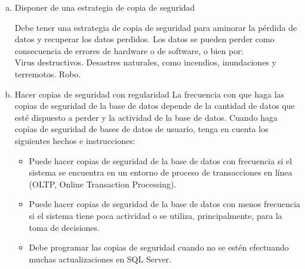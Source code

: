 \documentclass[a4paper,twocolumn,10pt]{article}
\begin{document}
   \begin{enumerate}[a)]
        \item Disponer de una estrategia de copia de seguridad

\normalsize Debe tener una estrategia de copia de seguridad para aminorar la p\'erdida de datos y recuperar los datos perdidos. Los datos se pueden perder como consecuencia de errores de hardware o de software, o bien por:\\

\normalsize Virus destructivos.
\normalsize Desastres naturales, como incendios, inundaciones y terremotos.
\normalsize Robo.\\

      \item  Hacer copias de seguridad con regularidad
La frecuencia con que haga las copias de seguridad de la base de datos depende de la cantidad de datos que est\'e dispuesto a perder y la actividad de la base de datos. Cuando haga copias de seguridad de bases de datos de usuario, tenga en cuenta los siguientes hechos e instrucciones:
  \begin{itemize}
    \item Puede hacer copias de seguridad de la base de datos con frecuencia si el sistema se encuentra en un entorno de proceso de transacciones en l\'inea (OLTP, Online Transaction Processing).
    \item Puede hacer copias de seguridad de la base de datos con menos frecuencia si el sistema tiene poca actividad o se utiliza, principalmente, para la toma de decisiones.
    \item Debe programar las copias de seguridad cuando no se est\'en efectuando muchas actualizaciones en SQL Server.
    
   \end{itemize}

 \end{enumerate}
\renewcommand{\labelitemi}{$-$}
\renewcommand{\labelitemii}{$\cdot$}
\end{document}
